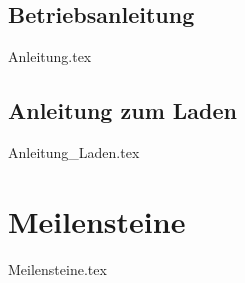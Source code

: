 \documentclass[paper=a4,12pt]{scrreprt}
\begin{document}
\section{Betriebsanleitung}
{Anleitung.tex}

\section{Anleitung zum Laden \label{sec:Anleitung_Laden}}
{Anleitung_Laden.tex}

\chapter{Meilensteine}
{Meilensteine.tex}

\clearpage
\appendix
\def\chapterpagestyle{empty} 




\setcounter{lofdepth}{2}
\dipalistoffigures

\setcounter{lotdepth}{2}
\dipalistoftables

\newpage

 
 
\end{document}
